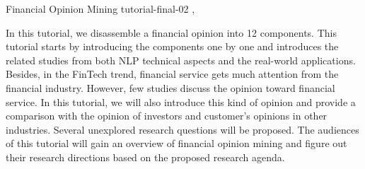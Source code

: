 \begin{tutorial}
  {Financial Opinion Mining}
  {tutorial-final-02}
  {\daydateyear, \tutorialmorningtime}
  {\TutLocA}

In this tutorial, we disassemble a financial opinion into 12 components. This tutorial starts by introducing the components one by one and introduces the related studies from both NLP technical aspects and the real-world applications. Besides, in the FinTech trend, financial service gets much attention from the financial industry. However, few studies discuss the opinion toward financial service. In this tutorial, we will also introduce this kind of opinion and provide a comparison with the opinion of investors and customer's opinions in other industries. Several unexplored research questions will be proposed. The audiences of this tutorial will gain an overview of financial opinion mining and figure out their research directions based on the proposed research agenda.

\end{tutorial}
